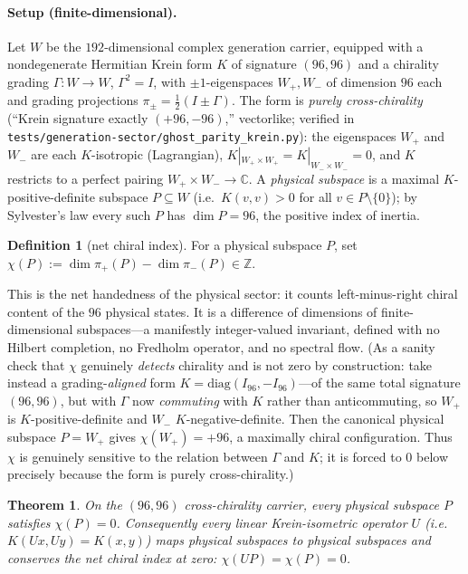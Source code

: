 \documentclass[11pt]{article}
\newtheorem{theorem}{Theorem}
\theoremstyle{definition}
\newtheorem{definition}{Definition}
\theoremstyle{remark}
\newcommand{\Z}{\mathbb{Z}}
\begin{document}
\paragraph{Setup (finite-dimensional).} Let $W$ be the $192$-dimensional complex generation carrier, equipped
with a nondegenerate Hermitian Krein form $K$ of signature $(96,96)$ and a chirality grading
$\Gamma\colon W\to W$, $\Gamma^2=I$, with $\pm1$-eigenspaces $W_+,W_-$ of dimension $96$ each and grading
projections $\pi_\pm=\tfrac12(I\pm\Gamma)$. The form is \emph{purely cross-chirality} (``Krein signature exactly
$(+96,-96)$,'' vectorlike; verified in \texttt{tests/generation-sector/ghost\_parity\_krein.py}): the eigenspaces
$W_+$ and $W_-$ are each $K$-isotropic (Lagrangian), $K|_{W_+\times W_+}=K|_{W_-\times W_-}=0$, and $K$ restricts
to a perfect pairing $W_+\times W_-\to\mathbb{C}$. A \emph{physical subspace} is a maximal $K$-positive-definite
subspace $P\subseteq W$ (i.e.\ $K(v,v)>0$ for all $v\in P\setminus\{0\}$); by Sylvester's law every such $P$ has
$\dim P=96$, the positive index of inertia.

\begin{definition}[net chiral index]\label{def:chi}
For a physical subspace $P$, set $\chi(P):=\dim\pi_+(P)-\dim\pi_-(P)\in\Z$.
\end{definition}

\noindent This is the net handedness of the physical sector: it counts left-minus-right chiral content of the
$96$ physical states. It is a difference of dimensions of finite-dimensional subspaces---a manifestly
integer-valued invariant, defined with no Hilbert completion, no Fredholm operator, and no spectral flow. (As a
sanity check that $\chi$ genuinely \emph{detects} chirality and is not zero by construction: take instead a
grading-\emph{aligned} form $K=\mathrm{diag}(I_{96},-I_{96})$---of the same total signature $(96,96)$, but with
$\Gamma$ now \emph{commuting} with $K$ rather than anticommuting, so $W_+$ is $K$-positive-definite and $W_-$
$K$-negative-definite. Then the canonical physical subspace $P=W_+$ gives $\chi(W_+)=+96$, a maximally chiral
configuration. Thus $\chi$ is genuinely sensitive to the relation between $\Gamma$ and $K$; it is forced to $0$
below precisely because the form is purely cross-chirality.)

\begin{theorem}\label{thm:2}
On the $(96,96)$ cross-chirality carrier, every physical subspace $P$ satisfies $\chi(P)=0$. Consequently every
linear Krein-isometric operator $U$ (i.e.\ $K(Ux,Uy)=K(x,y)$) maps physical subspaces to physical subspaces and
conserves the net chiral index at zero: $\chi(UP)=\chi(P)=0$.
\end{theorem}
\end{document}
